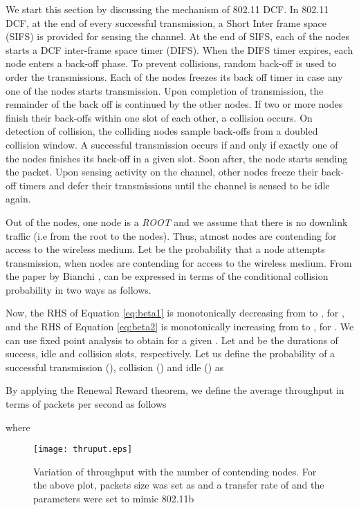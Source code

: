 \documentclass[10pt, conference, compsocconf]{IEEEtran}
\begin{document}
We start this section by discussing the mechanism of 802.11 DCF. In 802.11 DCF, at the end of every successful transmission, a Short Inter frame space (SIFS) is provided for sensing the channel. At the end of SIFS, each of the nodes starts a DCF inter-frame space timer (DIFS). When the DIFS timer expires, each node enters a back-off phase. To prevent collisions, random back-off is used to order the transmissions. Each of the nodes freezes its back off timer in case any one of the nodes starts transmission. Upon completion of transmission, the remainder of the back off is continued by the other nodes. If two or more nodes finish their back-offs within one slot of each other, a collision occurs. On detection of collision, the colliding  nodes sample back-offs from a doubled collision window. A successful transmission occurs if and only if exactly one of the nodes finishes its back-off in a given slot. Soon after, the node starts sending the packet. Upon sensing activity on the channel, other nodes freeze their back-off timers and defer their transmissions until the channel is sensed to be idle again.

Out of the  nodes, one node is a \textit{ROOT} and we assume that there is no downlink traffic (i.e from the root to the nodes). Thus, atmost  nodes are contending for access to the wireless medium. Let  be the probability that a node attempts transmission, when  nodes are contending for access to the wireless medium. From the paper by Bianchi \cite{bianchi},  can be expressed in terms of the conditional collision probability  in two ways as follows.




Now, the RHS of Equation \eqref{eq:beta1} is monotonically decreasing from  to , for , and the RHS of Equation \eqref{eq:beta2} is monotonically increasing from  to , for . We can use fixed point analysis to obtain  for a given . Let  and  be the durations of success, idle and collision slots, respectively. Let us define the probability of a successful transmission (), collision () and idle () as


	
By applying the Renewal Reward theorem, we define the average throughput in terms of packets per second as follows

where


\begin{figure}[h]
\centering
\texttt{[image: thruput.eps]}
\caption {Variation of throughput with the number of contending nodes. For the above plot, packets size was set as  and a transfer rate of  and the parameters were set to mimic 802.11b}
\label{fig:thruput}
\end{figure}
\end{document}
